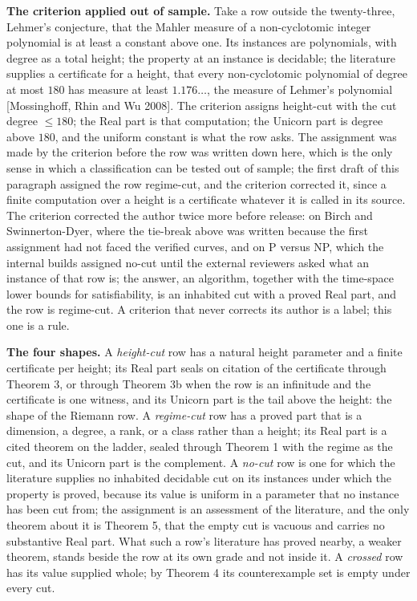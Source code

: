 \documentclass[10pt]{article}
\begin{document}
\textbf{The criterion applied out of sample.} Take a row outside the
twenty-three, Lehmer's conjecture, that the Mahler measure of a
non-cyclotomic integer polynomial is at least a constant above one. Its
instances are polynomials, with degree as a total height; the property
at an instance is decidable; the literature supplies a certificate for a
height, that every non-cyclotomic polynomial of degree at most \(180\)
has measure at least \(1.176\ldots\), the measure of Lehmer's polynomial
{[}Mossinghoff, Rhin and Wu 2008{]}. The criterion assigns height-cut
with the cut degree \(\le 180\); the Real part is that computation; the
Unicorn part is degree above \(180\), and the uniform constant is what
the row asks. The assignment was made by the criterion before the row
was written down here, which is the only sense in which a classification
can be tested out of sample; the first draft of this paragraph assigned
the row regime-cut, and the criterion corrected it, since a finite
computation over a height is a certificate whatever it is called in its
source. The criterion corrected the author twice more before release: on
Birch and Swinnerton-Dyer, where the tie-break above was written because
the first assignment had not faced the verified curves, and on P versus
NP, which the internal builds assigned no-cut until the external
reviewers asked what an instance of that row is; the answer, an
algorithm, together with the time-space lower bounds for satisfiability,
is an inhabited cut with a proved Real part, and the row is regime-cut.
A criterion that never corrects its author is a label; this one is a
rule.

\textbf{The four shapes.} A \emph{height-cut} row has a natural height
parameter and a finite certificate per height; its Real part seals on
citation of the certificate through Theorem 3, or through Theorem 3b
when the row is an infinitude and the certificate is one witness, and
its Unicorn part is the tail above the height: the shape of the Riemann
row. A \emph{regime-cut} row has a proved part that is a dimension, a
degree, a rank, or a class rather than a height; its Real part is a
cited theorem on the ladder, sealed through Theorem 1 with the regime as
the cut, and its Unicorn part is the complement. A \emph{no-cut} row is
one for which the literature supplies no inhabited decidable cut on its
instances under which the property is proved, because its value is
uniform in a parameter that no instance has been cut from; the
assignment is an assessment of the literature, and the only theorem
about it is Theorem 5, that the empty cut is vacuous and carries no
substantive Real part. What such a row's literature has proved nearby, a
weaker theorem, stands beside the row at its own grade and not inside
it. A \emph{crossed} row has its value supplied whole; by Theorem 4 its
counterexample set is empty under every cut.
\end{document}
